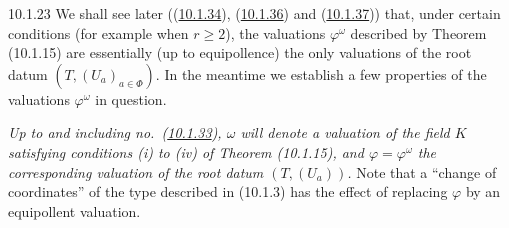 \documentclass[12pt,a4paper,oneside,english]{smfart}
\makeatletter
\newcommand{\btanchor}[1]{\leavevmode\Hy@raisedlink{\hypertarget{bt:#1}{}}}
\newcommand{\btref}[1]{\hyperlink{bt:#1}{#1}}
\theoremstyle{definition}
\theoremstyle{bt}
\makeatother
\begin{document}
\num{10.1.23}\btanchor{10.1.23} We shall see later ((\btref{10.1.34}), (\btref{10.1.36}) and (\btref{10.1.37})) that,
under certain conditions (for example when $r\ge2$), the valuations
$\varphi^{\omega}$ described by Theorem (10.1.15) are essentially (up to
equipollence) the only valuations of the root datum
$(T,(U_a)_{a\in\Phi})$. In the meantime we establish a few properties of the
valuations $\varphi^{\omega}$ in question.

\emph{Up to and including no.\ (\btref{10.1.33}), $\omega$ will denote a valuation of the
field $K$ satisfying conditions (i) to (iv) of Theorem (10.1.15), and
$\varphi=\varphi^{\omega}$ the corresponding valuation of the root datum
$(T,(U_a))$.} Note that a ``change of coordinates'' of the type described in
(10.1.3) has the effect of replacing $\varphi$ by an equipollent valuation.
\par\endgroup

\begingroup\setlength{\parindent}{1.5em}
\allowdisplaybreaks
\providecommand{\R}{}
\renewcommand{\R}{\mathbf{R}}
\providecommand{\Z}{}
\renewcommand{\Z}{\mathbf{Z}}
\providecommand{\Kse}{}
\renewcommand{\Kse}{\mathrm{K}_{\sigma,\varepsilon}}
\providecommand{\K}{}
\renewcommand{\K}{\mathrm{K}}
\providecommand{\Is}{}
\renewcommand{\Is}{\mathrm{Is}}
\providecommand{\Sim}{}
\renewcommand{\Sim}{\mathrm{Sim}}
\providecommand{\Isom}{}
\renewcommand{\Isom}{\mathrm{Isom}}
\providecommand{\Hom}{}
\renewcommand{\Hom}{\operatorname{Hom}}
\providecommand{\End}{}
\renewcommand{\End}{\operatorname{End}}
\providecommand{\Tr}{}
\renewcommand{\Tr}{\operatorname{Tr}}
\providecommand{\Ker}{}
\renewcommand{\Ker}{\operatorname{Ker}}
\providecommand{\id}{}
\renewcommand{\id}{\mathrm{id.}}
\providecommand{\ov}{}
\renewcommand{\ov}{\overline{\omega}}
\providecommand{\Bor}{}
\renewcommand{\Bor}{\mathscr{B}}
\providecommand{\Nor}{}
\renewcommand{\Nor}{\mathscr{N}}
\providecommand{\Eor}{}
\renewcommand{\Eor}{\mathscr{E}}
\providecommand{\Ech}{}
\renewcommand{\Ech}{\mathscr{E}}
\providecommand{\Build}{}
\renewcommand{\Build}{\mathscr{I}}
\providecommand{\Jcal}{}
\renewcommand{\Jcal}{\mathscr{J}}
\providecommand{\Ncal}{}
\renewcommand{\Ncal}{\mathscr{N}}
\providecommand{\Phat}{}
\renewcommand{\Phat}{\widehat{\mathrm{P}}}
\providecommand{\Nhat}{}
\renewcommand{\Nhat}{\widehat{\mathrm{N}}}
\providecommand{\What}{}
\renewcommand{\What}{\widehat{\mathrm{W}}}
\providecommand{\stmt}{}
\renewcommand{\stmt}[2]{\medskip\noindent\emph{#1} \textbf{(#2)}.\ ---\ }
\providecommand{\num}{}
\renewcommand{\num}[1]{\medskip\noindent\textbf{(#1)}\ }
\providecommand{\pf}{}
\renewcommand{\pf}{\par\medskip\noindent}
\begin{center}

\end{center}
\end{document}
